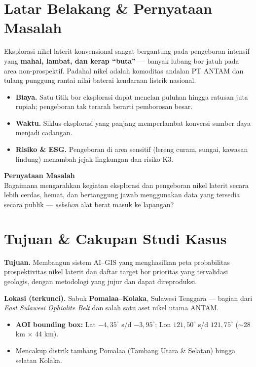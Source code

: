 \documentclass[11pt,a4paper]{article}
\newcommand{\callout}[2]{%
  \begin{center}\colorbox{softgray}{\parbox{0.96\linewidth}{%
  \vspace{2pt}\textbf{\color{antamblue}#1}\\[2pt]#2\vspace{2pt}}}\end{center}}
\begin{document}
\section{Latar Belakang \& Pernyataan Masalah}

Eksplorasi nikel laterit konvensional sangat bergantung pada pengeboran intensif
yang \textbf{mahal, lambat, dan kerap ``buta''} --- banyak lubang bor jatuh pada
area non-prospektif. Padahal nikel adalah komoditas andalan PT ANTAM dan tulang
punggung rantai nilai baterai kendaraan listrik nasional.

\begin{itemize}
  \item \textbf{Biaya.} Satu titik bor eksplorasi dapat menelan puluhan hingga
  ratusan juta rupiah; pengeboran tak terarah berarti pemborosan besar.
  \item \textbf{Waktu.} Siklus eksplorasi yang panjang memperlambat konversi
  sumber daya menjadi cadangan.
  \item \textbf{Risiko \& ESG.} Pengeboran di area sensitif (lereng curam, sungai,
  kawasan lindung) menambah jejak lingkungan dan risiko K3.
\end{itemize}

\callout{Pernyataan Masalah}{%
Bagaimana mengarahkan kegiatan eksplorasi dan pengeboran nikel laterit secara
lebih cerdas, hemat, dan bertanggung jawab menggunakan data yang tersedia secara
publik --- \textit{sebelum} alat berat masuk ke lapangan?}

\section{Tujuan \& Cakupan Studi Kasus}

\textbf{Tujuan.} Membangun sistem AI--GIS yang menghasilkan peta probabilitas
prospektivitas nikel laterit dan daftar target bor prioritas yang
tervalidasi geologis, dengan metodologi yang jujur dan dapat direproduksi.

\textbf{Lokasi (terkunci).} Sabuk \textbf{Pomalaa--Kolaka}, Sulawesi Tenggara ---
bagian dari \textit{East Sulawesi Ophiolite Belt} dan salah satu aset nikel
utama ANTAM.
\begin{itemize}
  \item \textbf{AOI bounding box:} Lat $-4{,}35^\circ$ s/d $-3{,}95^\circ$;
  Lon $121{,}50^\circ$ s/d $121{,}75^\circ$ ($\sim$28 km $\times$ 44 km).
  \item Mencakup distrik tambang Pomalaa (Tambang Utara \& Selatan) hingga selatan Kolaka.
\end{itemize}
\end{document}
